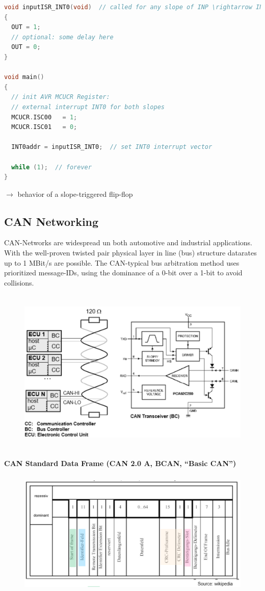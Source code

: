 \begin{lstlisting}[style=mystyle, language=c]
void inputISR_INT0(void)  // called for any slope of INP \rightarrow INT0
{
  OUT = 1;
  // optional: some delay here 
  OUT = 0;
}

void main()
{
  // init AVR MCUCR Register:
  // external interrupt INT0 for both slopes
  MCUCR.ISC00	= 1;  
  MCUCR.ISC01	= 0;  

  INT0addr = inputISR_INT0;  // set INT0 interrupt vector

  while (1);  // forever
}
\end{lstlisting}

$\rightarrow$ behavior of a slope-triggered flip-flop

\subsection{CAN Networking}

CAN-Networks are widespread un both automotive and industrial applications. With the well-proven twisted pair physical layer in line (bus) structure datarates up to 1 MBit/s are possible. The CAN-typical bus arbitration method uses prioritized message-IDs, using the dominance of a 0-bit over a 1-bit to avoid collisions.

    \begin{figure}[h]
    \centering
    \includegraphics[width=14cm, height=8cm]{Images/image53.png}
    \label{fig:Fig }
    \end{figure}

\textbf{CAN Standard Data Frame (CAN 2.0 A, BCAN, ``Basic CAN'')}

    \begin{figure}[h]
    \centering
    \includegraphics[width=15cm, height=6cm]{Images/image54.png}
    \label{fig:Fig }
    \end{figure}

